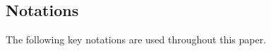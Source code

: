 \documentclass[smallextended]{svjour3}       %
\begin{document}
\begin{Abstract}
%

\subsection{Notations}
The following key notations are used throughout this paper.\newpage
\begin{table}[H]


\end{table}
\end{Abstract}
\end{document}
